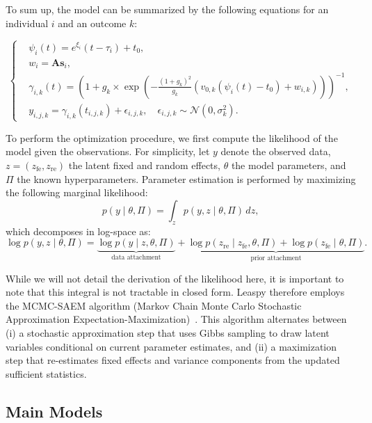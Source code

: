 \documentclass{rapportCS}
\begin{document}
To sum up, the model can be summarized by the following equations for an individual $i$ and an outcome $k$:

\begin{equation}
\left\{
\begin{aligned}
  & \psi_i(t) = e^{\xi_i}(t - \tau_i) + t_0, \\
  & w_{i} = \mathbf{A}\mathbf{s}_i, \\
  & \gamma_{i,k}(t) = \left(1 + g_k \times \exp \left(-\frac{(1+g_k)^2}{g_k} (v_{0,k} (\psi_i(t) - t_0) + w_{i,k})\right)\right)^{-1}, \\
  & y_{i,j,k} = \gamma_{i,k}(t_{i,j,k}) + \epsilon_{i,j,k}, \quad \epsilon_{i,j,k} \sim \mathcal{N}(0, \sigma_k^2).
\end{aligned}
\right.
\end{equation}

To perform the optimization procedure, we first compute the likelihood of the model given the observations. For simplicity, let $y$ denote the observed data, $z = (z_{\mathrm{fe}}, z_{\mathrm{re}})$ the latent fixed and random effects, $\theta$ the model parameters, and $\Pi$ the known hyperparameters. Parameter estimation is performed by maximizing the following marginal likelihood:
\begin{equation}
  p(y \mid \theta, \Pi) = \int_{z} p(y, z \mid \theta, \Pi)\, dz,
\end{equation}
which decomposes in log-space as:
\begin{equation}
  \log p(y, z \mid \theta, \Pi)
    = \underbrace{\log p(y \mid z, \theta, \Pi)}_{\text{data attachment}}
    + \underbrace{\log p(z_{\mathrm{re}} \mid z_{\mathrm{fe}}, \theta, \Pi)
                + \log p(z_{\mathrm{fe}} \mid \theta, \Pi)}_{\text{prior attachment}}.
\end{equation}

While we will not detail the derivation of the likelihood here, it is important to note that this integral is not tractable in closed form. Leaspy therefore employs the MCMC-SAEM algorithm (Markov Chain Monte Carlo Stochastic Approximation Expectation-Maximization)~\cite{kuhn2005maximum}. This algorithm alternates between (i) a stochastic approximation step that uses Gibbs sampling to draw latent variables conditional on current parameter estimates, and (ii) a maximization step that re-estimates fixed effects and variance components from the updated sufficient statistics.

\subsection{Main Models}
\end{document}

